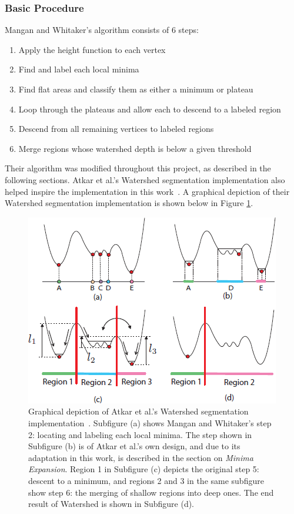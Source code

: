 \subsubsection{Basic Procedure}
Mangan and Whitaker's algorithm consists of 6 steps:
\begin{enumerate}
	\item Apply the height function to each vertex
	\item Find and label each local minima
	\item Find flat areas and classify them as either a minimum or plateau
	\item \label{plateau_step} Loop through the plateaus and allow each to descend to a labeled region
	\item Descend from all remaining vertices to labeled regions
	\item Merge regions whose watershed depth is below a given threshold
\end{enumerate}

Their algorithm was modified throughout this project, as described in the following sections.
Atkar et al.'s Watershed segmentation implementation also helped inspire the implementation in this work~\cite{HierSurfSeg_for_autobody_painting}.
A graphical depiction of their Watershed segmentation implementation is shown below in Figure \ref{fig:ws_1570179_steps}.
\begin{figure}[htb]
	\centering
	\includegraphics[width=0.5\linewidth]{../resources/watershed/1570179_WS_steps.png}
\caption{
Graphical depiction of Atkar et al.'s Watershed segmentation implementation~\cite{HierSurfSeg_for_autobody_painting}.
Subfigure (a) shows Mangan and Whitaker's step 2: locating and labeling each local minima.
The step shown in Subfigure (b) is of Atkar et al.'s own design, and due to its adaptation in this work, is described in the section on \textit{Minima Expansion}.
Region 1 in Subfigure (c) depicts the original step 5: descent to a minimum, and regions 2 and 3 in the same subfigure show step 6: the merging of shallow regions into deep ones.
The end result of Watershed is shown in Subfigure (d).
}
	\label{fig:ws_1570179_steps}
\end{figure}

